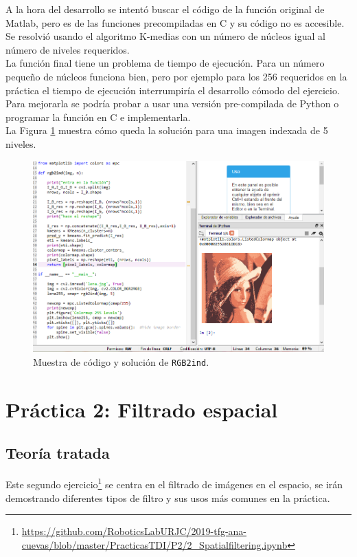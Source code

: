 A la hora del desarrollo se intentó buscar el código de la función original de Matlab, pero es de las funciones precompiladas en C y su código no es accesible. Se resolvió usando el algoritmo K-medias con un número de núcleos igual al número de niveles requeridos.\\

 La función final tiene un problema de tiempo de ejecución. Para un número pequeño de núcleos funciona bien, pero por ejemplo para los 256 requeridos en la práctica el tiempo de ejecución interrumpiría el desarrollo cómodo del ejercicio. Para mejorarla se podría probar a usar una versión pre-compilada de Python o programar la función en C e implementarla.\\

La Figura \ref{rgb2ind} muestra cómo queda la solución para una imagen indexada de 5 niveles.

\begin{figure}[h]
\centering
\includegraphics[width=1\textwidth]{imagenes/rgb2ind}
\caption{Muestra de código y solución de \texttt{RGB2ind}.}
\label{rgb2ind}
\end{figure}


\section{Práctica 2: Filtrado espacial}

\subsection{Teoría tratada}

Este segundo ejercicio\footnote{\url{https://github.com/RoboticsLabURJC/2019-tfg-ana-cuevas/blob/master/PracticasTDI/P2/2_Spatialfiltering.ipynb}} se centra en el filtrado de imágenes en el espacio, se irán demostrando diferentes tipos de filtro y sus usos más comunes en la práctica.\\

